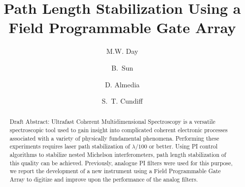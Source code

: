 \documentclass[letterpaper,12pt,amsmath,reprint,aip,jmp,onecolumn]{revtex4-1}
\begin{document}
\title{Path Length Stabilization Using a Field Programmable Gate Array}
\author{M.W. Day}
\author{B.~Sun}%
%

\author{D. Almedia}


\author{S.~T. Cundiff}

\begin{abstract}
Draft Abstract: Ultrafast Coherent Multidimensional Spectroscopy is a versatile spectroscopic tool used to gain insight into complicated coherent electronic processes associated with a variety of physically fundamental phenomena. Performing these experiments requires laser path stabilization of $\lambda / 100$ or better. Using PI control algorithms to stabilize nested Michelson interferometers, path length stabilization of this quality can be achieved. Previously, analogue PI filters were used for this purpose, we report the development of a new instrument using a Field Programmable Gate Array to digitize and improve upon the performance of the analog filters.
\end{abstract}
\maketitle
\end{document}
